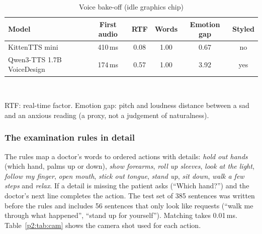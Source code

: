 \documentclass[10pt]{article}
\begin{document}
\begin{table}[htbp]
\caption{Voice bake-off (idle graphics chip)}
\label{p2:tab:tts}
\centering
\scriptsize
\setlength{\tabcolsep}{3pt}
\begin{tabular}{@{}lccccc@{}}
\toprule
Model & First audio & RTF & Words & Emotion gap & Styled\\
\midrule
KittenTTS mini & 410\,ms & 0.08 & 1.00 & 0.67 & no\\
Qwen3-TTS 1.7B VoiceDesign & 174\,ms & 0.57 & 1.00 & 3.92 & yes\\
\bottomrule
\end{tabular}
\\[1mm]\raggedright\scriptsize RTF: real-time factor. Emotion gap: pitch and loudness distance between a sad and an anxious reading (a proxy, not a
judgement of naturalness).
\end{table}

\subsubsection{The examination rules in detail}
The rules map a doctor's words to ordered actions with details: \emph{hold out hands} (which hand, palms up or down), \emph{show forearms},
\emph{roll up sleeves}, \emph{look at the light}, \emph{follow my finger}, \emph{open mouth}, \emph{stick out tongue}, \emph{stand up},
\emph{sit down}, \emph{walk a few steps} and \emph{relax}. If a detail is missing the patient asks (``Which hand?'') and the doctor's next line
completes the action. The test set of 385 sentences was written before the rules and includes 56 sentences that only look like requests (``walk
me through what happened'', ``stand up for yourself''). Matching takes 0.01\,ms. Table~\ref{p2:tab:cam} shows the camera shot used for each action.
\end{document}
